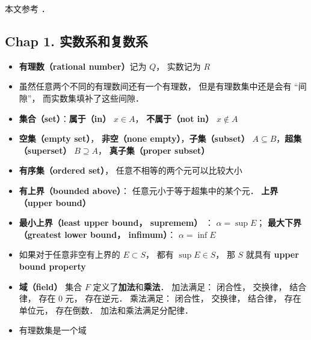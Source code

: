 
\begin{issues}
\issueMissDepend
{}
\end{issues}

本文参考 \cite{Rudin}．

\subsection{Chap 1. 实数系和复数系}

\begin{itemize}
\item \textbf{有理数（rational number）}记为 $Q$， 实数记为 $R$

\item 虽然任意两个不同的有理数间还有一个有理数， 但是有理数集中还是会有 “间隙”， 而实数集填补了这些间隙．

\item \textbf{集合（set）}：\textbf{属于（in）} $x \in A$， \textbf{不属于（not in）} $x \notin A$

\item \textbf{空集（empty set）}， \textbf{非空（none empty）}，\textbf{子集（subset）} $A \subseteq B$，\textbf{超集（superset）} $B \supseteq A$， \textbf{真子集（proper subset）}

\item \textbf{有序集（ordered set）}， 任意不相等的两个元可以比较大小

\item \textbf{有上界（bounded above）}： 任意元小于等于超集中的某个元． \textbf{上界（upper bound）}

\item \textbf{最小上界（least upper bound， supremem）} ： $\alpha = \sup E$； \textbf{最大下界（greatest lower bound， infimum）}： $\alpha = \inf E$

\item 如果对于任意非空有上界的 $E \subset S$， 都有 $\sup E \in S$， 那 $S$ 就具有 \textbf{upper bound property}

\item \textbf{域（field）} 集合 $F$ 定义了\textbf{加法}和\textbf{乘法}． 加法满足： 闭合性， 交换律， 结合律， 存在 0 元， 存在逆元． 乘法满足： 闭合性， 交换律， 结合律， 存在单位元， 存在倒数． 加法和乘法满足分配律．

\item 有理数集是一个域


\end{itemize}
